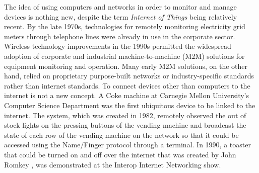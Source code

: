 \documentclass[conference]{IEEEtran}
\begin{document}
The idea of using computers and networks in order to monitor and manage devices
is nothing new, despite the term \textit{Internet of Things} being relatively
recent. By the late 1970s, technologies for remotely monitoring electricity
grid meters through telephone lines were already in use in the corporate
sector. Wireless technology improvements in the 1990s permitted the widespread
adoption of corporate and industrial machine-to-machine (M2M) solutions for
equipment monitoring and operation. Many early M2M solutions, on the other
hand, relied on proprietary purpose-built networks or industry-specific
standards rather than internet standards. To connect devices other than
computers to the internet is not a new concept. A Coke machine at Carnegie
Mellon University's Computer Science Department \cite{EverhartInteresting}
was the first ubiquitous device to be linked to the internet. The system,
which was created in 1982, remotely observed the out of stock lights on the
pressing buttons of the vending machine and broadcast the state of each row
of the vending machine on the network so that it could be accessed using
the Name/Finger protocol through a terminal. In 1990, a toaster that could
be turned on and off over the internet that was created by John Romkey \cite{RomkeyToast},
was demonstrated at the Interop Internet Networking show.

\end{document}
